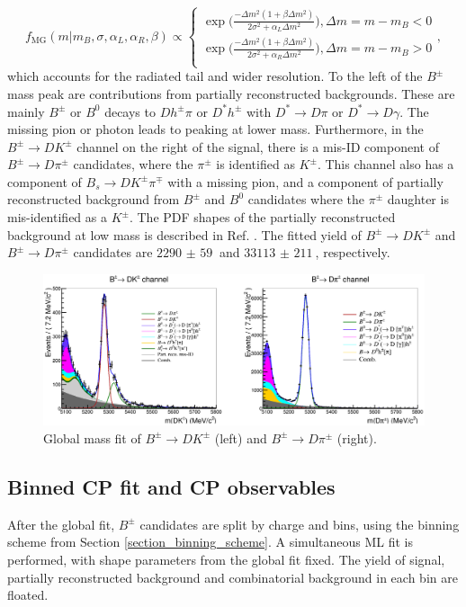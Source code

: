 \documentclass[12pt, a4paper, notitlepage, onecolumn]{article}
\numberwithin{equation}{section}
\begin{document}
\begin{equation}
  f_\text{MG}(m|m_B, \sigma, \alpha_L, \alpha_R, \beta)\propto
  \begin{cases}
    \exp\Big(\frac{-\Delta m^2(1 + \beta\Delta m^2)}{2\sigma^2 + \alpha_L\Delta m^2}\Big), \Delta m = m - m_B < 0 \\
    \exp\Big(\frac{-\Delta m^2(1 + \beta\Delta m^2)}{2\sigma^2 + \alpha_R\Delta m^2}\Big), \Delta m = m - m_B > 0 \\
  \end{cases},
\end{equation}
which accounts for the radiated tail and wider resolution. To the left of the $B^\pm$ mass peak are contributions from partially reconstructed backgrounds. These are mainly $B^\pm$ or $B^0$ decays to $Dh^\pm\pi$ or $D^*h^\pm$ with $D^*\to D\pi$ or $D^*\to D\gamma$. The missing pion or photon leads to peaking at lower mass. Furthermore, in the $B^\pm\to DK^\pm$ channel on the right of the signal, there is a mis-ID component of $B^\pm\to D\pi^\pm$ candidates, where the $\pi^\pm$ is identified as $K^\pm$. This channel also has a component of $B_s\to DK^\pm\pi^\mp$ with a missing pion, and a component of partially reconstructed background from $B^\pm$ and $B^0$ candidates where the $\pi^\pm$ daughter is mis-identified as a $K^\pm$. The PDF shapes of the partially reconstructed background at low mass is described in Ref. \cite{cite_LHCbGGSZKSpipi}. The fitted yield of $B^\pm\to DK^\pm$ and $B^\pm\to D\pi^\pm$ candidates are $\SI{2290(59)}{}$ and $\SI{33113(211)}{}$, respectively.

\begin{figure}[H] 
  \centering
  \includegraphics[width=1\textwidth]{Plots/GlobalFit.png}
  \caption{Global mass fit of $B^\pm\to DK^\pm$ (left) and $B^\pm\to D\pi^\pm$ (right).}
  \label{fig_Bmass_Global}
\end{figure}

\subsection{Binned CP fit and CP observables}
\noindent After the global fit, $B^\pm$ candidates are split by charge and bins, using the binning scheme from Section \ref{section_binning_scheme}. A simultaneous ML fit is performed, with shape parameters from the global fit fixed. The yield of signal, partially reconstructed background and combinatorial background in each bin are floated.
\end{document}

